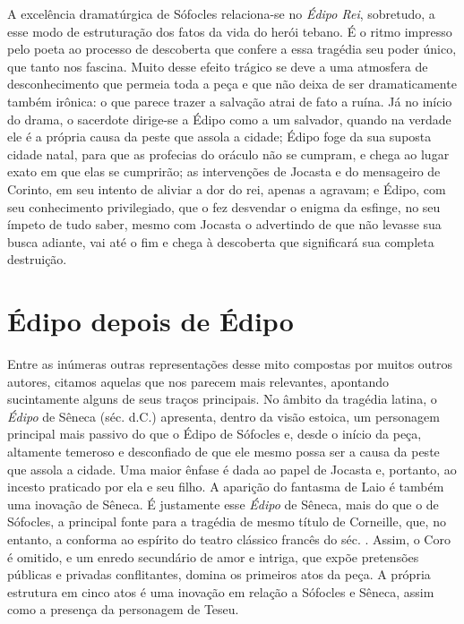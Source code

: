 A excelência dramatúrgica de Sófocles relaciona-se no \emph{Édipo Rei},
sobretudo, a esse modo de estruturação dos fatos da vida do herói
tebano. É o ritmo impresso pelo poeta ao processo de descoberta que
confere a essa tragédia seu poder único, que tanto nos fascina. Muito
desse efeito trágico se deve a uma atmosfera de desconhecimento que
permeia toda a peça e que não deixa de ser dramaticamente também
irônica: o que parece trazer a salvação atrai de fato a ruína. Já no
início do drama, o sacerdote dirige-se a Édipo como a um salvador,
quando na verdade ele é a própria causa da peste que assola a cidade;
Édipo foge da sua suposta cidade natal, para que as profecias do oráculo
não se cumpram, e chega ao lugar exato em que elas se cumprirão; as
intervenções de Jocasta e do mensageiro de Corinto, em seu intento de
aliviar a dor do rei, apenas a agravam; e Édipo, com seu conhecimento
privilegiado, que o fez desvendar o enigma da esfinge, no seu ímpeto de
tudo saber, mesmo com Jocasta o advertindo de que não levasse sua busca
adiante, vai até o fim e chega à descoberta que significará sua completa
destruição.



\chapter{Édipo depois de Édipo}


Entre as inúmeras outras representações desse mito compostas por muitos
outros autores, citamos aquelas que nos parecem mais relevantes,
apontando sucintamente alguns de seus traços principais. No âmbito da
tragédia latina, o \emph{Édipo} de Sêneca (séc.  d.C.)
apresenta, dentro da visão estoica, um personagem principal mais passivo
do que o Édipo de Sófocles e, desde o início da peça, altamente temeroso
e desconfiado de que ele mesmo possa ser a causa da peste que assola a
cidade. Uma maior ênfase é dada ao papel de Jocasta e, portanto, ao
incesto praticado por ela e seu filho. A aparição do fantasma de Laio é
também uma inovação de Sêneca. É justamente esse \emph{Édipo} de Sêneca,
mais do que o de Sófocles, a principal fonte para a tragédia de mesmo
título de Corneille, que, no entanto, a conforma ao espírito do
teatro clássico francês do séc. . Assim, o Coro é omitido, e um
enredo secundário de amor e intriga, que expõe pretensões públicas e
privadas conflitantes, domina os primeiros atos da peça. A própria
estrutura em cinco atos é uma inovação em relação a Sófocles e Sêneca,
assim como a presença da personagem de Teseu.

